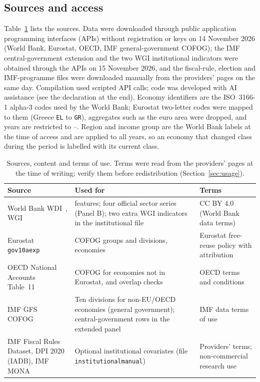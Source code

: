 \documentclass[11pt,a4paper]{article}
\DeclareRobustCommand*{\_}{\textunderscore\hskip0pt\relax}
\begin{document}
\subsection{Sources and access}
Table~\ref{tab:sources} lists the sources. Data were downloaded through public application programming interfaces (APIs) without registration or keys on 14 November 2026 (World Bank, Eurostat, OECD, IMF general-government COFOG); the IMF central-government extension and the two WGI institutional indicators were obtained through the APIs on 15 November 2026, and the fiscal-rule, election and IMF-programme files were downloaded manually from the providers' pages on the same day. Compilation used scripted API calls; code was developed with AI assistance (see the declaration at the end). Economy identifiers are the ISO~3166-1 alpha-3 codes used by the World Bank; Eurostat two-letter codes were mapped to them (Greece \texttt{EL} to \texttt{GR}), aggregates such as the euro area were dropped, and years are restricted to \DYearLo--\DYearHi. Region and income group are the World Bank labels at the time of access and are applied to all years, so an economy that changed class during the period is labelled with its current class.
\begin{table}[t]
\caption{Sources, content and terms of use. Terms were read from the providers' pages at the time of writing; verify them before redistribution (Section~\ref{sec:usage}).}\label{tab:sources}
\centering\small\renewcommand{\arraystretch}{1.1}
\begin{tabular}{@{}p{3.0cm}p{5.9cm}p{4.9cm}@{}}
\toprule
Source & Used for & Terms \\
\midrule
World Bank WDI~\cite{wdi}, WGI~\cite{kaufmann2011} & \DNumFeat{} features; four official sector series (Panel B); two extra WGI indicators in the institutional file & CC BY 4.0 (World Bank data terms) \\
Eurostat \texttt{gov\_10a\_exp}~\cite{eurostat_cofog} & COFOG groups and divisions, \DSixEconEs{} economies & Eurostat free-reuse policy with attribution \\
OECD National Accounts Table~11~\cite{oecd_table11} & COFOG for \DOecdAdded{} economies not in Eurostat, and overlap checks & OECD terms and conditions \\
IMF GFS COFOG~\cite{imf_gfs} & Ten divisions for non-EU/OECD economies (general government); central-government rows in the extended panel & IMF data terms of use \\
IMF Fiscal Rules Dataset, DPI 2020 (IADB), IMF MONA & Optional institutional covariates (file \texttt{institutional\_manual}) & Providers' terms; non-commercial research use \\
\bottomrule
\end{tabular}
\end{table}
\end{document}
